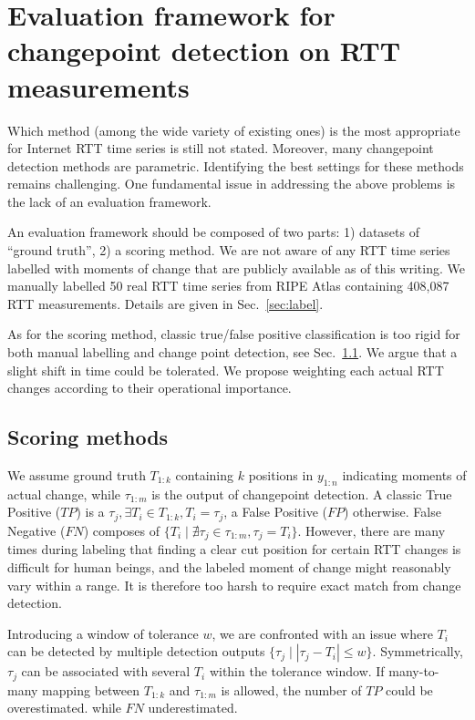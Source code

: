 \section{Evaluation framework for changepoint detection on RTT measurements}
\label{sec:eval_frame}
Which method (among the wide variety of existing ones) is the most appropriate for Internet RTT time series is still not stated. Moreover, many changepoint detection methods are parametric. Identifying the best settings for these methods remains challenging.
One fundamental issue in addressing the above problems is the lack of an evaluation framework.

An evaluation framework should be composed of two parts: 1) datasets of ``ground truth'', 2) a scoring method.
We are not aware of any RTT time series labelled with moments of change that are publicly available as of this writing.
We manually labelled 50 real RTT time series from RIPE Atlas containing 408,087 RTT measurements.
Details are given in Sec.~\ref{sec:label}.

As for the scoring method, classic true/false positive classification is too rigid for 
both manual labelling and change point detection, see Sec.~\ref{sec:score}.
We argue that a slight shift in time could be tolerated.
We propose weighting each actual RTT changes according to their operational importance. 

\subsection{Scoring methods}
\label{sec:score}

We assume ground truth $T_{1:k}$ containing $k$ positions in $y_{1:n}$ indicating moments of actual change, while $\tau_{1:m}$ is the output of changepoint detection.
A classic True Positive ($TP$) is a $\tau_j, \exists T_i \in T_{1:k}, T_i = \tau_j$, a False Positive ($FP$) otherwise. False Negative ($FN$) composes of $\{T_i \mid \nexists \tau_j \in \tau_{1:m}, \tau_j = T_i \}$.
However, there are many times during labeling that finding a clear cut position for certain RTT changes is difficult for human beings, and the labeled moment of change might reasonably vary within a range.
It is therefore too harsh to require exact match from change detection.

Introducing a window of tolerance $w$, we are confronted with an issue where 
$T_i$ can be detected by multiple detection outputs $ \{\tau_j \mid |\tau_j - T_i| \leq w \}$. 
Symmetrically, $\tau_j$ can be associated with several $T_i$ within the tolerance window.
If many-to-many mapping between $T_{1:k}$ and $\tau_{1:m}$ is allowed, the number of $TP$ could be overestimated. while $FN$ underestimated.


